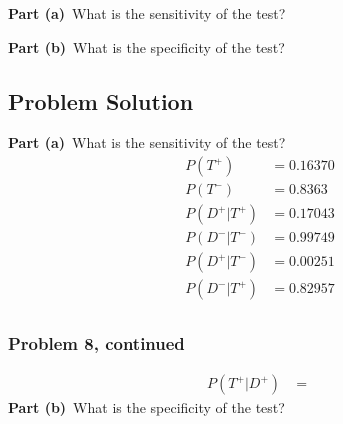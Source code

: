 \documentclass[12pt]{article}
\theoremstyle{definition}
\begin{document}
\bigskip
\noindent
{\bf Part (a)}\ What is the sensitivity of the test?

\bigskip
\noindent
{\bf Part (b)}\ What is the specificity of the test?


\subsection*{Problem Solution}

\noindent
{\bf Part (a)}\ What is the sensitivity of the test?
\begin{align*}
P(T^+) &= 0.16370\\
P(T^-) &= 0.8363\\
P(D^+|T^+) &= 0.17043\\
P(D^-|T^-) &= 0.99749\\
P(D^+|T^-) &= 0.00251\\
P(D^-|T^+) &= 0.82957\\
\end{align*}


\newpage
\subsubsection*{Problem 8, continued}
\begin{align*}
P(T^+|D^+) &= \frac{}{}
\end{align*}
\vspace{2in}
\noindent
{\bf Part (b)}\ What is the specificity of the test?
\begin{align*}
\end{align*}
\end{document}
